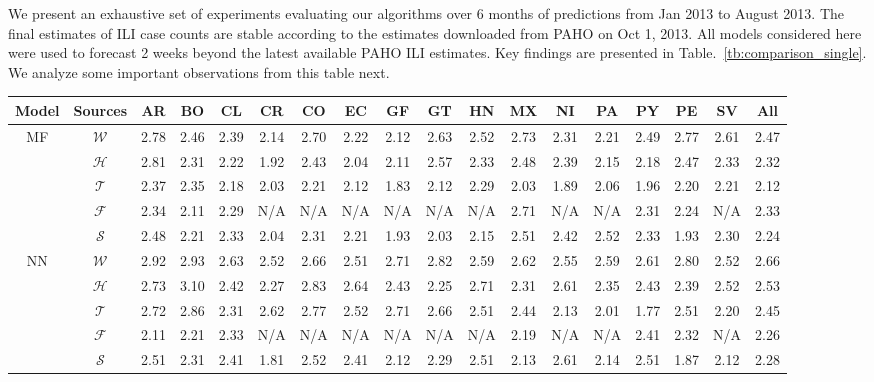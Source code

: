 
We present an exhaustive set of experiments evaluating our algorithms 
over 6 months of predictions 
from Jan 2013 to August 2013. The final estimates of ILI case counts are stable according
to the estimates downloaded from PAHO on Oct 1, 2013. All models considered here were
used to forecast 2 weeks beyond the latest available PAHO ILI estimates. 
Key findings
are presented in 
Table.~\ref{tb:comparison_single}. We analyze 
some important observations from this table next.

\begin{table*}[H]
\scriptsize
\centering
\captionsetup{font=scriptsize}
\caption{\label{tb:comparison_single}  Comparing forecastng accuracy of models using individual sources.}
\vspace{-1em}
\begin{tabular}{|*{18}{c|}}
\hline
Model               & Sources       & AR & BO & CL & CR & CO & EC & GF & GT & HN & MX & NI & PA & PY & PE & SV & All\\
\hline \hline
\multirow{5}{*}{MF} & $\mathcal{W}$ &2.78&2.46&2.39&2.14&2.70&2.22&2.12&2.63&2.52&2.73&2.31&2.21&2.49&2.77&2.61&2.47\\ 
                    & $\mathcal{H}$ &2.81&2.31&2.22&1.92&2.43&2.04&2.11&2.57&2.33&2.48&2.39&2.15&2.18&2.47&2.33&2.32\\ 
                    & $\mathcal{T}$ &2.37&2.35&2.18&2.03&2.21&2.12&1.83&2.12&2.29&2.03&1.89&2.06&1.96&2.20&2.21&2.12\\ 
                    & $\mathcal{F}$ &2.34&2.11&2.29& N/A& N/A& N/A& N/A& N/A& N/A&2.71& N/A& N/A&2.31&2.24& N/A&2.33\\ 
                    & $\mathcal{S}$ &2.48&2.21&2.33&2.04&2.31&2.21&1.93&2.03&2.15&2.51&2.42&2.52&2.33&1.93&2.30&2.24 \\ 
\hline
\multirow{5}{*}{NN} & $\mathcal{W}$ &2.92&2.93&2.63&2.52&2.66&2.51&2.71&2.82&2.59&2.62&2.55&2.59&2.61&2.80&2.52&2.66\\ 
                    & $\mathcal{H}$ &2.73&3.10&2.42&2.27&2.83&2.64&2.43&2.25&2.71&2.31&2.61&2.35&2.43&2.39&2.52&2.53\\ 
                    & $\mathcal{T}$ &2.72&2.86&2.31&2.62&2.77&2.52&2.71&2.66&2.51&2.44&2.13&2.01&1.77&2.51&2.20&2.45\\ 
                    & $\mathcal{F}$ &2.11&2.21&2.33& N/A& N/A& N/A& N/A& N/A& N/A&2.19& N/A& N/A&2.41&2.32& N/A&2.26\\ 
                    & $\mathcal{S}$ &2.51&2.31&2.41&1.81&2.52&2.41&2.12&2.29&2.51&2.13&2.61&2.14&2.51&1.87&2.12&2.28 \\ 

\end{tabular}
\end{table*}
